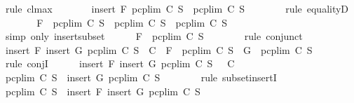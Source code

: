 \begin{isabellebody}
\ {\isacharparenleft}rule\ cl{\isacharunderscore}max{\isacharparenright}\isanewline
\ \ \ \ \isamarkupfalse%
\ \isamarkupfalse%
\ {\isachardoublequoteopen}insert\ F\ {\isacharparenleft}pcp{\isacharunderscore}lim\ C\ S{\isacharparenright}\ {\isasymsubseteq}\ pcp{\isacharunderscore}lim\ C\ S{\isachardoublequoteclose}\isanewline
\ \ \ \ \ \ \isamarkupfalse%
\ {\isacharparenleft}rule\ equalityD{}{\isacharparenright}\isanewline
\ \ \ \ \isamarkupfalse%
\ \isamarkupfalse%
\ {\isachardoublequoteopen}F\ {\isasymin}\ pcp{\isacharunderscore}lim\ C\ S\ {\isasymand}\ pcp{\isacharunderscore}lim\ C\ S\ {\isasymsubseteq}\ pcp{\isacharunderscore}lim\ C\ S{\isachardoublequoteclose}\isanewline
\ \ \ \ \ \ \isamarkupfalse%
\ {\isacharparenleft}simp\ only{\isacharcolon}\ insert{\isacharunderscore}subset{\isacharparenright}\isanewline
\ \ \ \ \isamarkupfalse%
\ {\isachardoublequoteopen}F\ {\isasymin}\ pcp{\isacharunderscore}lim\ C\ S{\isachardoublequoteclose}\isanewline
\ \ \ \ \ \ \isamarkupfalse%
\ {\isacharparenleft}rule\ conjunct{}{\isacharparenright}\isanewline
\ \ \isamarkupfalse%
\isanewline
{}\isamarkupfalse%
\isanewline
\ \ \isamarkupfalse%
\ {\isachardoublequoteopen}insert\ F\ {\isacharparenleft}insert\ G\ {\isacharparenleft}pcp{\isacharunderscore}lim\ C\ S{\isacharparenright}{\isacharparenright}\ {\isasymin}\ C\ {\isasymLongrightarrow}\ F\ {\isasymin}\ pcp{\isacharunderscore}lim\ C\ S\ {\isasymand}\ G\ {\isasymin}\ pcp{\isacharunderscore}lim\ C\ S{\isachardoublequoteclose}\isanewline
\ \ \isamarkupfalse%
\ {\isacharparenleft}rule\ conjI{\isacharparenright}\isanewline
\ \ \ \ \isamarkupfalse%
\ {\isachardoublequoteopen}insert\ F\ {\isacharparenleft}insert\ G\ {\isacharparenleft}pcp{\isacharunderscore}lim\ C\ S\ {\isacharparenright}{\isacharparenright}\ {\isasymin}\ C{\isachardoublequoteclose}\isanewline
\ \ \ \ \isamarkupfalse%
\ {\isachardoublequoteopen}pcp{\isacharunderscore}lim\ C\ S\ {\isasymsubseteq}\ insert\ G\ {\isacharparenleft}pcp{\isacharunderscore}lim\ C\ S{\isacharparenright}{\isachardoublequoteclose}\isanewline
\ \ \ \ \ \ \isamarkupfalse%
\ {\isacharparenleft}rule\ subset{\isacharunderscore}insertI{\isacharparenright}\isanewline
\ \ \ \ \isamarkupfalse%
\ \isamarkupfalse%
\ {\isachardoublequoteopen}pcp{\isacharunderscore}lim\ C\ S\ {\isasymsubseteq}\ insert\ F\ {\isacharparenleft}insert\ G\ {\isacharparenleft}pcp{\isacharunderscore}lim\ C\ S{\isacharparenright}{\isacharparenright}{\isachardoublequoteclose}\isanewline

\end{isabellebody}
